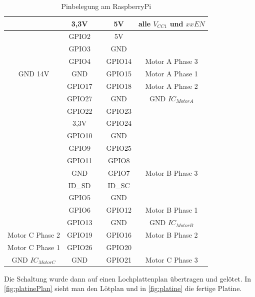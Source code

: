 \documentclass[12pt,a4paper,bibliography=totocnumbered,listof=totocnumbered]{scrartcl}
\begin{document}
\begin{table}[htp] 
	\centering 
	\begin{tabular}{|c||c|c|c||c|}
		\hline 
		& 3,3V &  & 5V & alle $V_{CC1}$ und $xxEN$ \\ 
		\hline 
		& GPIO2 &  & 5V &  \\ 
		\hline 
		& GPIO3 &  & GND &  \\ 
		\hline 
		& GPIO4 &  & GPIO14 & Motor A Phase 3 \\ 
		\hline 
		GND 14V& GND &  & GPIO15 & Motor A Phase 1 \\ 
		\hline 
		& GPIO17 &  & GPIO18 & Motor A Phase 2 \\ 
		\hline 
		& GPIO27 &  & GND & GND $IC_{MotorA}$ \\ 
		\hline 
		& GPIO22 &  & GPIO23 &  \\ 
		\hline 
		& 3,3V &  & GPIO24 &  \\ 
		\hline 
		& GPIO10 &  & GND &  \\ 
		\hline 
		& GPIO9 &  & GPIO25 &  \\ 
		\hline 
		& GPIO11 &  & GPIO8 &  \\ 
		\hline 
		& GND &  & GPIO7 & Motor B Phase 3 \\ 
		\hline 
		& ID\_SD &  & ID\_SC &  \\ 
		\hline 
		& GPIO5 &  & GND &  \\ 
		\hline 
		& GPIO6 &  & GPIO12 & Motor B Phase 1 \\ 
		\hline 
		& GPIO13 &  & GND & GND $IC_{MotorB}$ \\ 
		\hline 
		Motor C Phase 2& GPIO19 &  & GPIO16 & Motor B Phase 2 \\ 
		\hline 
		Motor C Phase 1& GPIO26 &  & GPIO20 &  \\ 
		\hline 
		GND $IC_{MotorC}$& GND &  & GPIO21 & Motor C Phase 3 \\ 
		\hline 
	\end{tabular} 
	\caption{Pinbelegung am RaspberryPi} 
	\label{tab:pins}
\end{table}

Die Schaltung wurde dann auf einen Lochplattenplan übertragen und gelötet. In \autoref{fig:platinePlan} sieht man den Lötplan und in \autoref{fig:platine} die fertige Platine.
\end{document}
